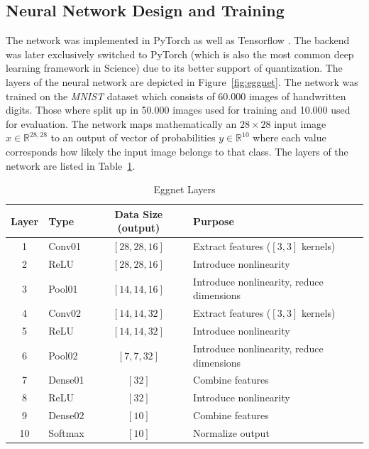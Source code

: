 \subsection{Neural Network Design and Training}
\label{subsec:nntraining}



The network was implemented in PyTorch \cite{Paszke:2019aa} as well as Tensorflow \cite{MartinAbadi:2015aa}. The backend was later exclusively switched to PyTorch (which is also the most common deep learning framework in Science) due to its better support of quantization. The layers of the neural network are depicted in Figure~\ref{fig:eggnet}. 
The network was trained on the \emph{MNIST} dataset which consists of 60.000 images of handwritten digits. Those where split up in 50.000 images used for training and 10.000 used for evaluation. The network maps mathematically an $28 \times 28$ input image $x \in \mathbb{R}^{28,28}$ to an output of vector of probabilities $y \in \mathbb{R}^{10}$ where each value corresponds how likely the input image belongs to that class. The layers of the network are listed in Table~\ref{tab:eggnet-layers}.

\begin{table}[h]
	\centering
	\begin{tabular}{clcl}
		\toprule
		Layer & Type	& 	Data Size (output)	& Purpose \\
		\midrule
		 1 & Conv01		&	$[28,28,16]$	& Extract features ($[3,3]$ kernels)		  \\
		 2 & ReLU		&	$[28,28,16]$	& Introduce nonlinearity  \\
		 3 & Pool01		&	$[14,14,16]$	& Introduce nonlinearity, reduce dimensions  \\
		 4 & Conv02 	&	$[14,14,32]$	& Extract features 	($[3,3]$ kernels)	  \\
		 5 & ReLU		&	$[14,14,32]$	& Introduce nonlinearity  \\
		 6 & Pool02		&	$[7,7,32]$	& Introduce nonlinearity, reduce dimensions  \\
		 7 & Dense01	&	$[32]$		& Combine features  \\
		 8 & ReLU		&	$[32]$		& Introduce nonlinearity  \\
		 9 & Dense02	&	$[10]$		& Combine features  \\
		10 & Softmax 	&	$[10]$		& Normalize output  \\
		\bottomrule
	\end{tabular}
	\label{tab:eggnet-layers}
	\caption{Eggnet Layers}
\end{table}

